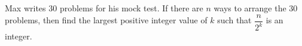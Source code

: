Max writes $30$ problems for his mock test. If there are $n$ ways to arrange the $30$ problems, then find the largest positive integer value of $k$ such that $\dfrac{n}{2^k}$ is an integer.
